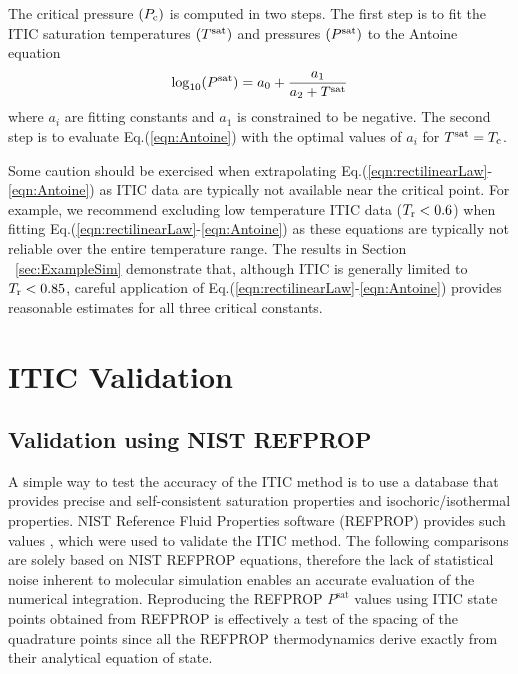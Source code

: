 \documentclass[5p,times]{elsarticle}
\begin{document}
The critical pressure $(P_{\rm c})$ is computed in two steps. The first step is to fit the ITIC saturation temperatures $(T^{\rm sat})$ and pressures $(P^{\rm sat})$ to the Antoine equation \cite{rowlinson2013liquids}
\begin{equation} \label{eqn:Antoine}
\log_{10}(P^{\rm sat}) = a_0 + \frac{a_1}{a_2 + T^{\rm sat}}
\end{equation} 
where $a_i$ are fitting constants and $a_1$ is constrained to be negative. The second step is to evaluate Eq.(\ref{eqn:Antoine}) with the optimal values of $a_i$ for $T^{\rm sat} = T_{\rm c}$. 

Some caution should be exercised when extrapolating Eq.(\ref{eqn:rectilinearLaw}-\ref{eqn:Antoine}) as ITIC data are typically not available near the critical point. For example, we recommend excluding low temperature ITIC data ($T_{\rm r} < 0.6$) when fitting Eq.(\ref{eqn:rectilinearLaw}-\ref{eqn:Antoine}) as these equations are typically not reliable over the entire temperature range. The results in Section ~\ref{sec:ExampleSim} demonstrate that, although ITIC is generally limited to $T_{\rm r} < 0.85$, careful application of Eq.(\ref{eqn:rectilinearLaw}-\ref{eqn:Antoine}) provides reasonable estimates for all three critical constants.








\section{ITIC Validation}\label{sec:NIST-VAL}
\subsection{Validation using NIST REFPROP} 
A simple way to test the accuracy of the ITIC method is to use a database that provides precise and self-consistent saturation properties and isochoric/isothermal properties. NIST Reference Fluid Properties software (REFPROP) provides such values \cite{LEMMON-RP91}, which were used to validate the ITIC method. The following comparisons are solely based on NIST REFPROP equations, therefore the lack of statistical noise inherent to molecular simulation enables an accurate evaluation of the numerical integration. Reproducing the REFPROP $P^{\mathrm{sat}}$ values using ITIC state points obtained from REFPROP is effectively a test of the spacing of the quadrature points since all the REFPROP thermodynamics derive exactly from their analytical equation of state.
\end{document}
